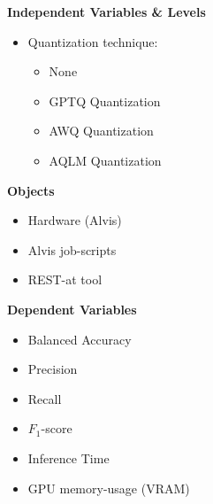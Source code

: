 \documentclass[conference]{IEEEtran}
\begin{document}
\begin{figure}[h]
\begin{center}
    \begin{tcbraster}[raster columns=2, raster column skip=5pt, raster equal height=rows, raster row skip=5pt]
        \begin{roundedBox}
            \centering
            \textbf{Independent Variables \& Levels}
            \begin{itemize}
                \item Quantization technique:
                \begin{itemize}
                    \item None
                    \item GPTQ Quantization
                    \item AWQ Quantization
                    \item AQLM Quantization
                \end{itemize}
            \end{itemize}
        \end{roundedBox}
        \begin{roundedBox}
            \centering
            \textbf{Objects}
            \begin{itemize}
                \item Hardware (Alvis)
                \item Alvis job-scripts
                \item REST-at tool
            \end{itemize}
        \end{roundedBox}
        \begin{roundedBox}
            \centering
            \textbf{Dependent Variables}
            \begin{itemize}
                \item Balanced Accuracy
                \item Precision
                \item Recall
                \item $F_1$-score
                \item Inference Time
                \item GPU memory-usage (VRAM)
            \end{itemize}
        \end{roundedBox}
        \begin{roundedBox}

\end{roundedBox}
\end{tcbraster}
\end{center}
\end{figure}
\end{document}
